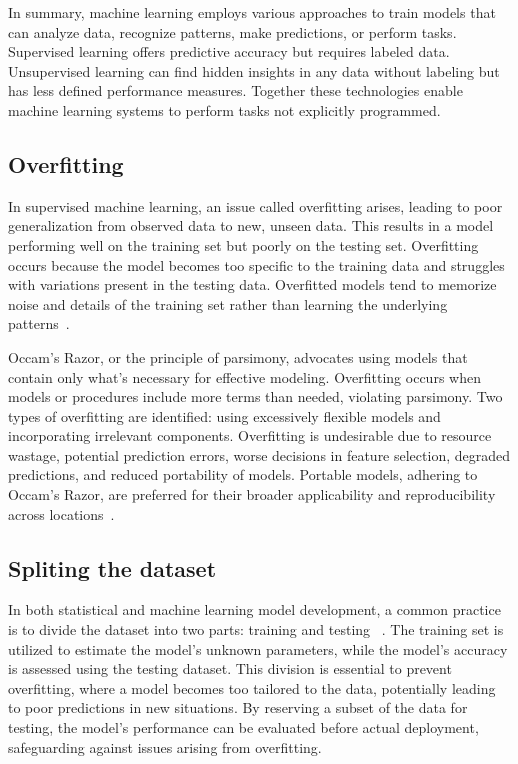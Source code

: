 In summary, machine learning employs various approaches to train models that can analyze data, recognize patterns, make predictions, or perform tasks. Supervised learning offers predictive accuracy but requires labeled data. Unsupervised learning can find hidden insights in any data without labeling but has less defined performance measures. Together these technologies enable machine learning systems to perform tasks not explicitly programmed.



\subsection{Overfitting}

In supervised machine learning, an issue called overfitting arises, leading to poor generalization from observed data to new, unseen data. This results in a model performing well on the training set but poorly on the testing set. Overfitting occurs because the model becomes too specific to the training data and struggles with variations present in the testing data. Overfitted models tend to memorize noise and details of the training set rather than learning the underlying patterns~\cite{Ying_2019}.

Occam's Razor, or the principle of parsimony, advocates using models that contain only what's necessary for effective modeling. Overfitting occurs when models or procedures include more terms than needed, violating parsimony. Two types of overfitting are identified: using excessively flexible models and incorporating irrelevant components. Overfitting is undesirable due to resource wastage, potential prediction errors, worse decisions in feature selection, degraded predictions, and reduced portability of models. Portable models, adhering to Occam's Razor, are preferred for their broader applicability and reproducibility across locations~\cite{hawkins2004of,cook2016overfitting}.


\subsection{Spliting the dataset}

In both statistical and machine learning model development, a common practice is to divide the dataset into two parts: training and testing ~\cite{hastie2009elements}. The training set is utilized to estimate the model's unknown parameters, while the model's accuracy is assessed using the testing dataset. This division is essential to prevent overfitting, where a model becomes too tailored to the data, potentially leading to poor predictions in new situations. By reserving a subset of the data for testing, the model's performance can be evaluated before actual deployment, safeguarding against issues arising from overfitting.

